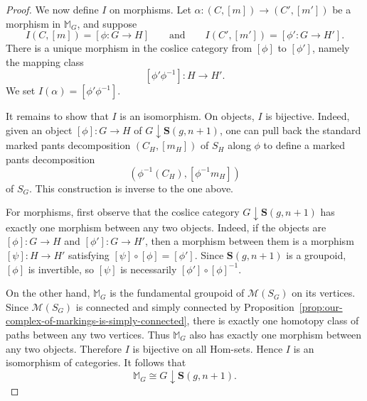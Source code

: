 \documentclass{amsart}
\newcommand{\bS}{\mathbf{S}}
\newcommand{\calM}{\mathcal{M}}
\newcommand{\Hom}{\operatorname{Hom}}
\newcommand{\ob}{\operatorname{ob}}
\theoremstyle{definition}
\numberwithin{equation}{section}
\begin{document}
\begin{proof}


\medskip

We now define $I$ on morphisms. Let $\alpha:(C,[m])\longrightarrow (C',[m'])$ be a morphism in $\mathbb{M}_G$, and suppose
\[
I(C,[m])=[\phi:G\to H]
\qquad \text{and} \qquad
I(C',[m'])=[\phi':G\to H'].
\]
There is a unique morphism in the coslice category from $[\phi]$ to $[\phi']$, namely the mapping class
\[
[\phi'\phi^{-1}]:H\longrightarrow H'.
\]
We set $I(\alpha)=[\phi'\phi^{-1}]$. %
    

\medskip 
It remains to show that $I$ is an isomorphism. On objects, $I$ is bijective. Indeed, given an object $[\phi]:G\to H$ of $G\downarrow \bS(g,n+1)$, one can pull back the standard marked pants decomposition $(C_H,[m_H])$ of $S_H$ along $\phi$ to define a marked pants decomposition
\[
(\phi^{-1}(C_H),[\phi^{-1}m_H])
\] of $S_G$. This construction is inverse to the one above.

For morphisms, first observe that the coslice category $G\downarrow \bS(g,n+1)$ has exactly one morphism between any two objects. Indeed, if the objects are $[\phi]:G\to H$ and $[\phi']:G\to H'$, then a morphism between them is a morphism $[\psi]:H\to H'$ satisfying $[\psi]\circ[\phi]=[\phi']$. Since $\bS(g,n+1)$ is a groupoid, $[\phi]$ is invertible, so $[\psi]$ is necessarily $[\phi']\circ[\phi]^{-1}$. %

On the other hand, $\mathbb{M}_G$ is the fundamental groupoid of $\calM(S_G)$ on its vertices. Since $\calM(S_G)$ is connected and simply connected by Proposition~\ref{prop:our-complex-of-markings-is-simply-connected}, there is exactly one homotopy class of paths between any two vertices. Thus $\mathbb{M}_G$ also has exactly one morphism between any two objects. Therefore $I$ is bijective on all Hom-sets. Hence $I$ is an isomorphism of categories. It follows that
\[
\mathbb{M}_G\cong G\downarrow \bS(g,n+1).
\]
\end{proof}
\end{document}

